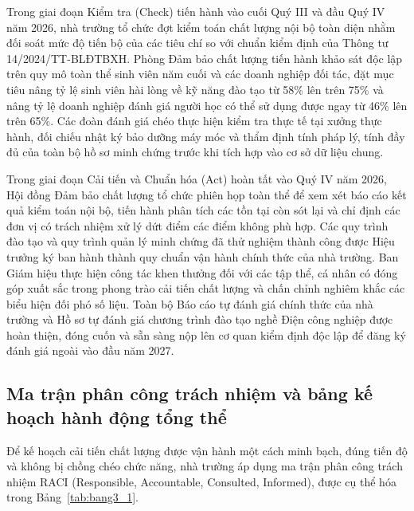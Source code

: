 Trong giai đoạn Kiểm tra (Check) tiến hành vào cuối Quý III và đầu Quý IV năm 2026, nhà trường tổ chức đợt kiểm toán chất lượng nội bộ toàn diện nhằm đối soát mức độ tiến bộ của các tiêu chí so với chuẩn kiểm định của Thông tư 14/2024/TT-BLĐTBXH. Phòng Đảm bảo chất lượng tiến hành khảo sát độc lập trên quy mô toàn thể sinh viên năm cuối và các doanh nghiệp đối tác, đặt mục tiêu nâng tỷ lệ sinh viên hài lòng về kỹ năng đào tạo từ 58\% lên trên 75\% và nâng tỷ lệ doanh nghiệp đánh giá người học có thể sử dụng được ngay từ 46\% lên trên 65\%. Các đoàn đánh giá chéo thực hiện kiểm tra thực tế tại xưởng thực hành, đối chiếu nhật ký bảo dưỡng máy móc và thẩm định tính pháp lý, tính đầy đủ của toàn bộ hồ sơ minh chứng trước khi tích hợp vào cơ sở dữ liệu chung.

Trong giai đoạn Cải tiến và Chuẩn hóa (Act) hoàn tất vào Quý IV năm 2026, Hội đồng Đảm bảo chất lượng tổ chức phiên họp toàn thể để xem xét báo cáo kết quả kiểm toán nội bộ, tiến hành phân tích các tồn tại còn sót lại và chỉ định các đơn vị có trách nhiệm xử lý dứt điểm các điểm không phù hợp. Các quy trình đào tạo và quy trình quản lý minh chứng đã thử nghiệm thành công được Hiệu trưởng ký ban hành thành quy chuẩn vận hành chính thức của nhà trường. Ban Giám hiệu thực hiện công tác khen thưởng đối với các tập thể, cá nhân có đóng góp xuất sắc trong phong trào cải tiến chất lượng và chấn chỉnh nghiêm khắc các biểu hiện đối phó số liệu. Toàn bộ Báo cáo tự đánh giá chính thức của nhà trường và Hồ sơ tự đánh giá chương trình đào tạo nghề Điện công nghiệp được hoàn thiện, đóng cuốn và sẵn sàng nộp lên cơ quan kiểm định độc lập để đăng ký đánh giá ngoài vào đầu năm 2027.

\subsection{Ma trận phân công trách nhiệm và bảng kế hoạch hành động tổng thể}

Để kế hoạch cải tiến chất lượng được vận hành một cách minh bạch, đúng tiến độ và không bị chồng chéo chức năng, nhà trường áp dụng ma trận phân công trách nhiệm RACI (Responsible, Accountable, Consulted, Informed), được cụ thể hóa trong Bảng~\ref{tab:bang3_1}.


